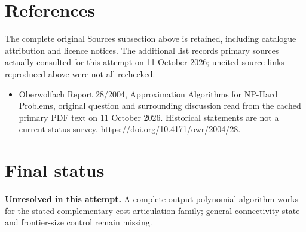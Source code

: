 \documentclass[11pt]{article}
\begin{document}
\section{References}
The complete original Sources subsection above is retained, including catalogue attribution and licence notices. The additional list records primary sources actually consulted for this attempt on 11 October 2026; uncited source links reproduced above were not all rechecked.
\begin{itemize}
\item Oberwolfach Report 28/2004, Approximation Algorithms for NP-Hard Problems, original question and surrounding discussion read from the cached primary PDF text on 11 October 2026. Historical statements are not a current-status survey. \url{https://doi.org/10.4171/owr/2004/28}.
\end{itemize}
\section{Final status}
\textbf{Unresolved in this attempt.} A complete output-polynomial algorithm works for the stated complementary-cost articulation family; general connectivity-state and frontier-size control remain missing.
\end{document}
